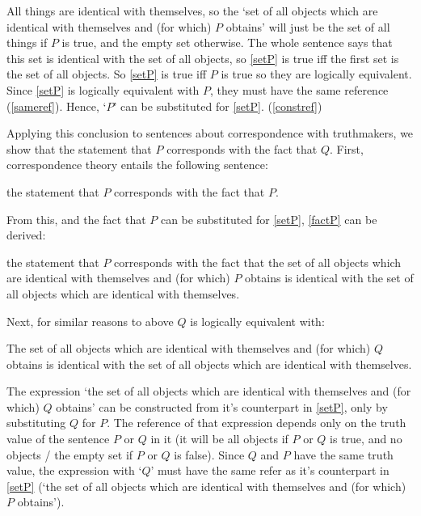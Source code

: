 All things are identical with themselves, so the `set of all objects which are identical with themselves and (for which) $P$ obtains' will just be the set of all things if $P$ is true, and the empty set otherwise.
The whole sentence says that this set is identical with the set of all objects, so \ref{setP} is true iff the first set is the set of all objects.
So \ref{setP} is true iff $P$ is true so they are logically equivalent.
Since \ref{setP} is logically equivalent with $P$, they must have the same reference (\ref{sameref}).
Hence, `$P$' can be substituted for \ref{setP}.
(\ref{constref})

Applying this conclusion to sentences about correspondence with truthmakers, we show that the statement that $P$ corresponds with the fact that $Q$.
First, correspondence theory entails the following sentence:

	\begin{example}\label{stateP}
	the statement that $P$ corresponds with the fact that $P$.
	\end{example}

From this, and the fact that $P$ can be substituted for \ref{setP}, \ref{factP} can be derived:

	\begin{example}\label{factP}
	the statement that $P$ corresponds with the fact that the set of all objects which are identical with themselves and (for which) $P$ obtains is identical with the set of all objects which are identical with themselves.
	\end{example}

Next, for similar reasons to above $Q$ is logically equivalent with:

	\begin{example}\label{setQ}
	The set of all objects which are identical with themselves and (for which) $Q$ obtains is identical with the set of all objects which are identical with themselves.
	\end{example}

The expression `the set of all objects which are identical with themselves and (for which) $Q$ obtains' can be constructed from it's counterpart in \ref{setP}, only by substituting $Q$ for $P$.
The reference of that expression depends only on the truth value of the sentence $P$ or $Q$ in it (it will be all objects if $P$ or $Q$ is true, and no objects / the empty set if $P$ or $Q$ is false).
Since $Q$ and $P$ have the same truth value, the expression with `$Q$' must have the same refer as it's counterpart in \ref{setP} (`the set of all objects which are identical with themselves and (for which) $P$ obtains').

